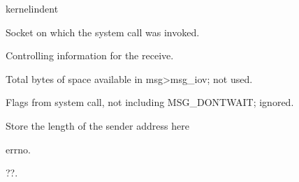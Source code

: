 \documentclass[letterpaper,10pt,english]{sphinxmanual}
\begin{document}
\begin{sphinxuseclass}{kernelindent}
\sphinxAtStartPar
{}
\begin{description}
\sphinxAtStartPar
Socket on which the system call was invoked.

\sphinxAtStartPar
Controlling information for the receive.

\sphinxAtStartPar
Total bytes of space available in msg\sphinxhyphen{}\textgreater{}msg\_iov; not used.

\sphinxAtStartPar
Flags from system call, not including MSG\_DONTWAIT; ignored.

\sphinxAtStartPar
Store the length of the sender address here

\end{description}

\sphinxAtStartPar
{}
\begin{description}
\sphinxAtStartPar
errno.

\end{description}

\end{sphinxuseclass}

\begin{fulllineitems}
\label{\detokenize{mtpimpl.c:c.MTP_sendpage}}
\pysigstartsignatures
\pysigstartmultiline
{}
\pysigstopmultiline
\pysigstopsignatures
\sphinxAtStartPar
??.

\end{fulllineitems}
\end{document}
